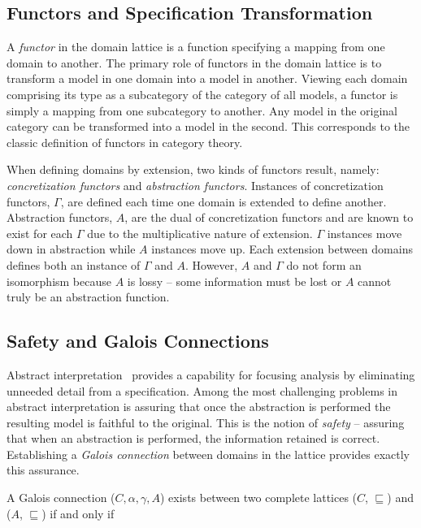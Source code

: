 \documentclass[12pt]{article}
\begin{document}
\subsection{Functors and Specification Transformation}

A \emph{functor} in the domain lattice is a function specifying a mapping from one domain
to another.  The primary role of functors in the domain lattice is to transform a model in
one domain into a model in another.  Viewing each domain comprising its type as a
subcategory of the category of all models, a functor is simply a mapping from one
subcategory to another.  Any model in the original category can be transformed into a
model in the second.  This corresponds to the classic definition of functors in category
theory.

When defining domains by extension, two kinds of functors result, namely:
\emph{concretization functors} and \emph{abstraction functors}.  Instances of
concretization functors, $\Gamma$, are defined each time one domain is extended to define
another.  Abstraction functors, $A$, are the dual of concretization functors and are known
to exist for each $\Gamma$ due to the multiplicative nature of extension.  $\Gamma$
instances move down in abstraction while $A$ instances move up.  Each extension between
domains defines both an instance of $\Gamma$ and $A$.  However, $A$ and $\Gamma$ do not
form an isomorphism because $A$ is lossy -- some information must be lost or $A$ cannot
truly be an abstraction function.

\subsection{Safety and Galois Connections}

Abstract interpretation~\cite{Cousot:00:Abstract-Interp} provides a capability for
focusing analysis by eliminating unneeded detail from a specification.  Among the most
challenging problems in abstract interpretation is assuring that once the abstraction is
performed the resulting model is faithful to the original.  This is the notion of
\emph{safety} -- assuring that when an abstraction is performed, the information retained
is correct.  Establishing a \emph{Galois connection} \cite{Nielson:05:Principles-of-P}
between domains in the lattice provides exactly this assurance.

A Galois connection ($C,\alpha,\gamma,A$) exists between two complete lattices ($C$,
$\sqsubseteq$) and ($A$, $\sqsubseteq$) if and only if
\end{document}
